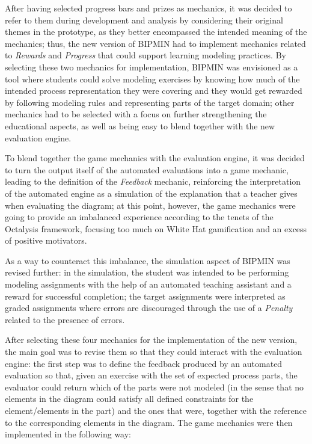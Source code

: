 After having selected progress bars and prizes as mechanics, it was decided to refer to them during development and analysis by considering their original themes in the prototype, as they better encompassed the intended meaning of the mechanics; thus, the new version of BIPMIN had to implement mechanics related to \textit{Rewards} and \textit{Progress} that could support learning modeling practices. By selecting these two mechanics for implementation, BIPMIN was envisioned as a tool where students could solve modeling exercises by knowing how much of the intended process representation they were covering and they would get rewarded by following modeling rules and representing parts of the target domain; other mechanics had to be selected with a focus on further strengthening the educational aspects, as well as being easy to blend together with the new evaluation engine. 

To blend together the game mechanics with the evaluation engine, it was decided to turn the output itself of the automated evaluations into a game mechanic, leading to the definition of the \textit{Feedback} mechanic, reinforcing the interpretation of the automated engine as a simulation of the explanation that a teacher gives when evaluating the diagram; at this point, however, the game mechanics were going to provide an imbalanced experience according to the tenets of the Octalysis framework, focusing too much on White Hat gamification and an excess of positive motivators.

As a way to counteract this imbalance, the simulation aspect of BIPMIN was revised further: in the simulation, the student was intended to be performing modeling assignments with the help of an automated teaching assistant and a reward for successful completion; the target assignments were interpreted as graded assignments where errors are discouraged through the use of a \textit{Penalty} related to the presence of errors.

After selecting these four mechanics for the implementation of the new version, the main goal was to revise them so that they could interact with the evaluation engine: the first step was to define the feedback produced by an automated evaluation so that, given an exercise with the set of expected process parts, the evaluator could return which of the parts were not modeled (in the sense that no elements in the diagram could satisfy all defined constraints for the element/elements in the part) and the ones that were, together with the reference to the corresponding elements in the diagram. The game mechanics were then implemented in the following way:

